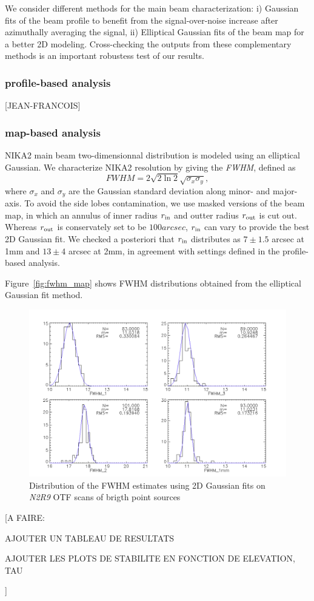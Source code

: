   
We consider different methods for the main beam characterization: i) Gaussian fits of the beam profile to benefit from the signal-over-noise increase after azimuthally averaging the signal, ii) Elliptical Gaussian fits of the beam map for a better 2D modeling. Cross-checking the outputs from these complementary methods is an important robustess test of our results.   



\subsubsection{profile-based analysis}

[JEAN-FRANCOIS]

\subsubsection{map-based analysis}

NIKA2 main beam two-dimensionnal distribution is modeled using an elliptical Gaussian. We characterize NIKA2 resolution by giving the \emph{FWHM}, defined as
\begin{equation}
  FWHM = 2 \sqrt{2\ln {2}} \sqrt{\sigma_x\sigma_y},
\end{equation}
where $\sigma_x$ and $\sigma_y$ are the Gaussian standard deviation along minor- and major-axis. To avoid the side lobes contamination, we use masked versions of the beam map, in which an annulus of inner radius $r_{\rm{in}}$ and outter radius $r_{\rm{out}}$ is cut out. Whereas $r_{\rm{out}}$ is conservately set to be $100 arcsec$, $r_{\rm{in}}$ can vary to provide the best 2D Gaussian fit. We checked a posteriori that $r_{\rm{in}}$ distributes as $7 \pm 1.5$ arcsec at 1mm and $13 \pm 4$ arcsec at 2mm, in agreement with settings defined in the profile-based analysis.   

Figure~\ref{fig:fwhm_map} shows FWHM distributions obtained from the elliptical Gaussian fit method.


\begin{figure}
\begin{center}
  \includegraphics[clip, angle=0, scale=0.4]{Figures/plot_histo_fwhm_run9_calibII_all_nocut.pdf}
\caption{Distribution of the FWHM estimates using 2D Gaussian fits on \emph{N2R9} OTF scans of brigth point sources}
\label{fig:features}
\end{center}
\end{figure}


[A FAIRE:

  AJOUTER UN TABLEAU DE RESULTATS


  AJOUTER LES PLOTS DE STABILITE EN FONCTION DE ELEVATION, TAU

]



